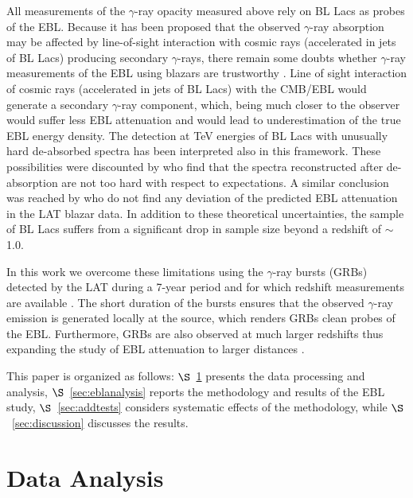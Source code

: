 \documentclass[12pt,preprint]{aastex}
\begin{document}
All measurements of the $\gamma$-ray opacity measured above rely on BL Lacs as probes of the EBL.
Because it has been proposed that the observed $\gamma$-ray absorption may 
be affected by line-of-sight interaction with cosmic rays 
(accelerated in jets of BL Lacs) producing secondary $\gamma$-rays, 
there remain some doubts whether $\gamma$-ray measurements of the EBL using blazars are trustworthy \citep{essey10,essey11}. 
Line of sight
interaction of cosmic rays (accelerated in jets of BL Lacs) with the CMB/EBL would
generate a secondary $\gamma$-ray component, which, being much closer to the observer
would suffer less EBL attenuation and
would lead to underestimation of
the true EBL energy density. 
The detection at TeV energies of  BL Lacs with
unusually hard de-absorbed spectra \citep[e.g.][]{horns12,furniss13} has been interpreted also in this framework. 
 {These possibilities} were discounted by \cite{biteau2015} who find that
the spectra reconstructed after de-absorption are not too hard with respect 
to expectations. 
A similar conclusion was reached by \cite{dominguez2015} who do not find any deviation of the 
predicted EBL attenuation in the LAT blazar data.
In addition to these theoretical uncertainties, the sample of BL Lacs suffers from a significant drop in sample size beyond a redshift of $\sim$1.0.

In this work we overcome these limitations using
the $\gamma$-ray bursts (GRBs) detected by the LAT 
during a 7-year period and for which redshift measurements are available \citep{hartmann07}.
{ The short duration of the bursts} ensures that the observed $\gamma$-ray emission
is generated locally at the source, which renders GRBs clean probes of the EBL.
Furthermore, {GRBs are also observed at much larger redshifts }\citep[i.e., $z=$4.3 for GRB~089016C as reported by][]{080916} thus expanding the study of EBL attenuation to larger distances { \citep[see e.g.][]{kashlinsky5}}. 

This paper is organized as follows: $\S$~\ref{sec:analysis} presents the 
data processing and analysis,
$\S$~\ref{sec:eblanalysis} reports the methodology and results of the EBL study, $\S$~\ref{sec:addtests}
considers systematic effects of the methodology, while $\S$~\ref{sec:discussion} discusses the results.


\section{Data Analysis}
\label{sec:analysis}
\end{document}
